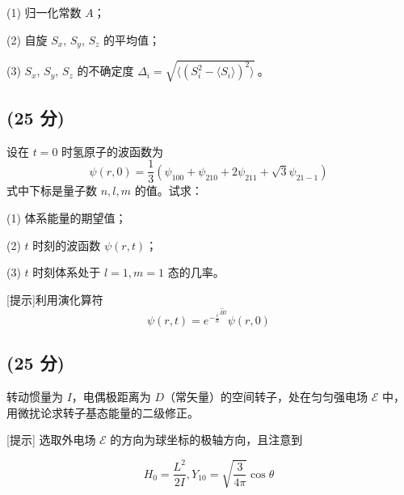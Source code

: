 (1) 归一化常数 \( A \)；

(2) 自旋 \( S_x \), \( S_y \), \( S_z \) 的平均值；

(3) \( S_x \), \( S_y \), \( S_z \) 的不确定度 \(\Delta_i = \sqrt{\langle (S_i^2  - \langle S_i \rangle)^2\rangle}~\)。

\subsection{(25 分)}
设在 \( t=0 \) 时氢原子的波函数为
\[\psi(r, 0) = \frac{1}{3} \left( \psi_{100} + \psi_{210} + 2 \psi_{211} + \sqrt{3} \psi_{21-1} \right)~\]
式中下标是量子数 \( n, l, m \) 的值。试求：

(1) 体系能量的期望值；

(2) \( t \) 时刻的波函数 \( \psi(r,t) \)；

(3) \( t \) 时刻体系处于 \( l=1, m=1 \) 态的几率。

[提示]利用演化算符
\[\psi(r,t) = e^{-\frac{i }{\hbar}^{\hat{H}t}} \psi(r,0)~\]
\subsection{(25 分)}
转动惯量为 $I$，电偶极距离为 $D$（常矢量）的空间转子，处在匀匀强电场 $\mathcal{E}$ 中，用微扰论求转子基态能量的二级修正。

[提示] 选取外电场 $\mathcal{E}$ 的方向为球坐标的极轴方向，且注意到

$$H_0 = \frac{L^2}{2I},Y_{10} = \sqrt{\frac{3}{4\pi}} \cos \theta~$$

